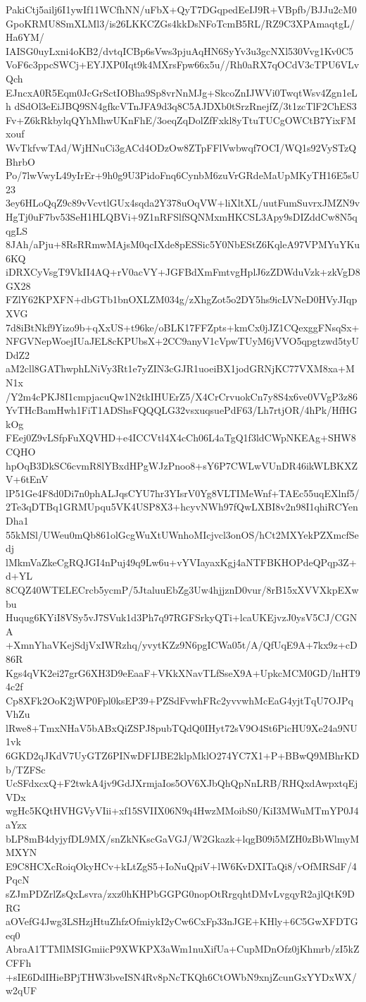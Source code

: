 PakiCtj5ailj6I1ywIf11WCfhNN/uFbX+QyT7DGqpedEeIJ9R+VBpfb/BJJu2cM0
GpoKRMU8SmXLMl3/is26LKKCZGs4kkDsNFoTcmB5RL/RZ9C3XPAmaqtgL/Ha6YM/
IAISG0uyLxni4oKB2/dvtqICBp6sVws3pjuAqHN6SyYv3u3gcNXl530Vvg1Kv0C5
VoF6c3ppcSWCj+EYJXP0Iqt9k4MXrsFpw66x5u//Rh0aRX7qOCdV3cTPU6VLvQch
EJncxA0R5Eqm0JcGrSctIOBha9Sp8vrNnMJg+SkcoZnIJWVi0TwqtWsv4Zgn1eLh
dSdOl3eEiJBQ9SN4gfkcVTnJFA9d3q8C5AJDXb0tSrzRnejfZ/3t1zcTlF2ChES3
Fv+Z6kRkbylqQYhMhwUKnFhE/3oeqZqDolZfFxkl8yTtuTUCgOWCtB7YixFMxouf
WvTkfvwTAd/WjHNuCi3gACd4ODzOw8ZTpFFlVwbwqf7OCI/WQ1s92VySTzQBhrbO
Po/7lwVwyL49yIrEr+9h0g9U3PidoFnq6CynbM6zuVrGRdeMaUpMKyTH16E5sU23
3ey6HLoQqZ9c89vVcvtlGUx4sqda2Y378uOqVW+liXltXL/uutFumSuvrxJMZN9v
HgTj0uF7bv53SeH1HLQBVi+9Z1nRFSlfSQNMxmHKCSL3Apy9sDIZddCw8N5qqgLS
8JAh/aPju+8RsRRmwMAjsM0qcIXde8pESSic5Y0NbEStZ6KqleA97VPMYuYKu6KQ
iDRXCyVsgT9VkII4AQ+rV0acVY+JGFBdXmFmtvgHplJ6zZDWduVzk+zkVgD8GX28
FZlY62KPXFN+dbGTb1bnOXLZM034g/zXhgZot5o2DY5hs9icLVNeD0HVyJIqpXVG
7d8iBtNkf9Yizo9b+qXxUS+t96ke/oBLK17FFZpts+kmCx0jJZ1CQexggFNsqSx+
NFGVNepWoejIUaJEL8cKPUbsX+2CC9anyV1cVpwTUyM6jVVO5qpgtzwd5tyUDdZ2
aM2cll8GAThwphLNiVy3Rt1e7yZIN3cGJR1uoeiBX1jodGRNjKC77VXM8xa+MN1x
/Y2m4cPKJ8I1cmpjacuQw1N2tkIHUErZ5/X4CrCrvuokCn7y8S4x6ve0VVgP3z86
YvTHcBamHwh1FiT1ADShsFQQQLG32vsxuqsuePdF63/Lh7rtjOR/4hPk/HfHGkOg
FEej0Z9vLSfpFuXQVHD+e4ICCVtl4X4cCh06L4aTgQ1f3ldCWpNKEAg+SHW8CQHO
hpOqB3DkSC6cvmR8lYBxdHPgWJzPnoo8+sY6P7CWLwVUnDR46ikWLBKXZV+6tEnV
lP51Ge4F8d0Di7n0phALJqsCYU7hr3YIsrV0Yg8VLTIMeWnf+TAEc55uqEXlnf5/
2Te3qDTBq1GRMUpqu5VK4USP8X3+hcyvNWh97fQwLXBI8v2n98I1qhiRCYenDha1
55kMSl/UWeu0mQb861olGcgWuXtUWnhoMIcjvcl3onOS/hCt2MXYekPZXmcfSedj
lMkmVaZkeCgRQJGI4nPuj49q9Lw6u+vYVIayaxKgj4aNTFBKHOPdeQPqp3Z+d+YL
8CQZ40WTELECrcb5ycmP/5JtaluuEbZg3Uw4hjjznD0vur/8rB15xXVVXkpEXwbu
Huqug6KYiI8VSy5vJ7SVuk1d3Ph7q97RGFSrkyQTi+lcaUKEjvzJ0ysV5CJ/CGNA
+XmnYhaVKejSdjVxIWRzhq/yvytKZz9N6pgICWa05t/A/QfUqE9A+7kx9z+cD86R
Kgs4qVK2ei27grG6XH3D9eEaaF+VKkXNavTLfSseX9A+UpkcMCM0GD/lnHT94c2f
Cp8XFk2OoK2jWP0Fpl0ksEP39+PZSdFvwhFRc2yvvwhMcEaG4yjtTqU7OJPqVhZu
lRwe8+TmxNHaV5bABxQiZSPJ8pubTQdQ0IHyt72sV9O4St6PicHU9Xe24a9NU1vk
6GKD2qJKdV7UyGTZ6PINwDFIJBE2klpMklO274YC7X1+P+BBwQ9MBhrKDb/TZFSc
UcSFdxcxQ+F2twkA4jv9GdJXrmjaIos5OV6XJbQhQpNnLRB/RHQxdAwpxtqEjVDx
wgHc5KQtHVHGVyVIii+xf15SVIIX06N9q4HwzMMoibS0/KiI3MWuMTmYP0J4aYzx
bLP8mB4dyjyfDL9MX/snZkNKscGaVGJ/W2Gkazk+lqgB09i5MZH0zBbWlmyMMXYN
E9C8HCXcRoiqOkyHCv+kLtZgS5+IoNuQpiV+lW6KvDXITaQi8/vOfMRSdF/4PqcN
sZJmPDZrlZsQxLsvra/zxz0hKHPbGGPG0nopOtRrgqhtDMvLvgqyR2ajlQtK9DRG
aOVefG4Jwg3LSHzjHtuZhfzOfmiykI2yCw6CxFp33nJGE+KHly+6C5GwXFDTGeq0
AbraA1TTMlMSIGmiicP9XWKPX3aWm1nuXifUa+CupMDnOfz0jKhmrb/zI5kZCFFh
+sIE6DdIHieBPjTHW3bveISN4Rv8pNcTKQh6CtOWbN9xnjZcunGxYYDxWX/w2qUF
